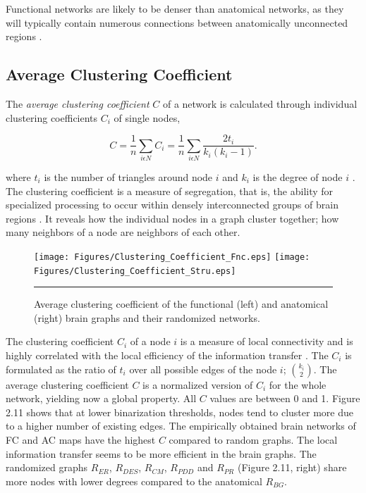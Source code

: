 Functional networks are likely to be denser than anatomical networks, as they will typically contain numerous connections between anatomically unconnected regions \citep{DAM09}. 

\subsection{Average Clustering Coefficient}
    
The \textit{average clustering coefficient} $C$ of a network is calculated through individual clustering coefficients $C_i$ of single nodes,

\begin{equation}
C = \frac{1}{n} \sum\limits_{i\epsilon N}C_i = \frac{1}{n}\sum\limits_{i\epsilon N} \frac{2t_i}{k_i(k_i -1)} .
\end{equation} 

where $t_i$ is the number of triangles around node $i$ and $k_i$ is the degree of node $i$ \citep{WAT98}. The clustering coefficient is a measure of segregation, that is, the ability for specialized processing to occur within densely interconnected groups of brain regions \citep{RUB10}. It reveals how the individual nodes in a graph cluster together; how many neighbors of a node are neighbors of each other. 

\begin{figure}[htbp]
  \centering
	\texttt{[image: Figures/Clustering\_Coefficient\_Fnc.eps]}
	\texttt{[image: Figures/Clustering\_Coefficient\_Stru.eps]} 
    \rule{35em}{0.5pt}
    \caption[Clustering Coefficient]{Average clustering coefficient of the functional (left) and anatomical (right) brain graphs and their randomized networks. }
  \label{fig:Clustering Coefficient}
\end{figure}

The clustering coefficient $C_i$ of a node $i$ is a measure of local connectivity and is highly correlated with the local efficiency of the information transfer \citep{LAT01}. The $C_i$ is formulated as the ratio of $t_i$ over all possible edges of the node $i$; $\binom{k_i}{2} $. The average clustering coefficient $C$ is a normalized version of $C_i$ for the whole network, yielding now a global property. All $C$ values are between 0 and 1. Figure 2.11 shows that at lower binarization thresholds, nodes tend to cluster more due to a higher number of existing edges. The empirically obtained brain networks of FC and AC maps have the highest $C$ compared to random graphs. The local information transfer seems to be more efficient in the brain graphs.  The randomized graphs $R_{ER}$, $R_{DES}$, $R_{CM}$, $R_{PDD}$ and $R_{PR}$ (Figure 2.11, right) share more nodes with lower degrees compared to the anatomical $R_{BG}$.

